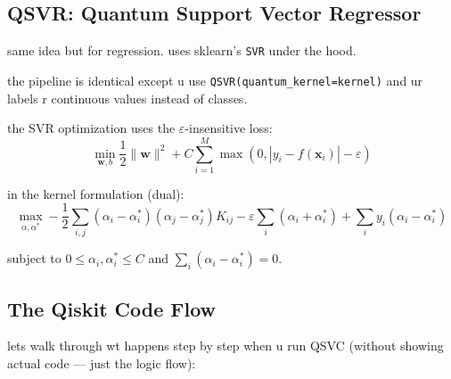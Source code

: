 \documentclass[11pt,a4paper]{article}
\theoremstyle{definition}
\theoremstyle{remark}
\begin{document}
\subsection{QSVR: Quantum Support Vector Regressor}

same idea but for regression. uses sklearn's \texttt{SVR} under the hood.

the pipeline is identical except u use \texttt{QSVR(quantum\_kernel=kernel)} and ur labels r continuous values instead of classes.

the SVR optimization uses the $\varepsilon$-insensitive loss:
\[
\min_{\mathbf{w}, b} \frac{1}{2}\|\mathbf{w}\|^2 + C \sum_{i=1}^M \max(0, |y_i - f(\mathbf{x}_i)| - \varepsilon)
\]

in the kernel formulation (dual):
\[
\max_{\alpha, \alpha^*} -\frac{1}{2}\sum_{i,j}(\alpha_i - \alpha_i^*)(\alpha_j - \alpha_j^*) K_{ij} - \varepsilon \sum_i (\alpha_i + \alpha_i^*) + \sum_i y_i(\alpha_i - \alpha_i^*)
\]

subject to $0 \leq \alpha_i, \alpha_i^* \leq C$ and $\sum_i (\alpha_i - \alpha_i^*) = 0$.

\subsection{The Qiskit Code Flow}

lets walk through wt happens step by step when u run QSVC (without showing actual code --- just the logic flow):
\end{document}

